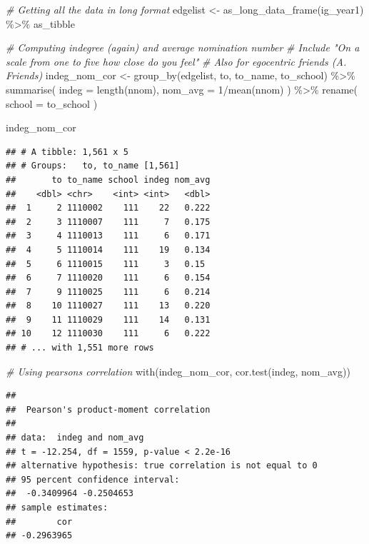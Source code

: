 \documentclass[
]{book}
\newenvironment{Shaded}{\begin{snugshade}}{\end{snugshade}}
\newcommand{\AttributeTok}[1]{\textcolor[rgb]{0.77,0.63,0.00}{#1}}
\newcommand{\CommentTok}[1]{\textcolor[rgb]{0.56,0.35,0.01}{\textit{#1}}}
\newcommand{\DecValTok}[1]{\textcolor[rgb]{0.00,0.00,0.81}{#1}}
\newcommand{\FunctionTok}[1]{\textcolor[rgb]{0.00,0.00,0.00}{#1}}
\newcommand{\NormalTok}[1]{#1}
\newcommand{\OtherTok}[1]{\textcolor[rgb]{0.56,0.35,0.01}{#1}}
\newcommand{\SpecialCharTok}[1]{\textcolor[rgb]{0.00,0.00,0.00}{#1}}
\begin{document}
\begin{Shaded}
\begin{Highlighting}[]
\CommentTok{\# Getting all the data in long format}
\NormalTok{edgelist }\OtherTok{\textless{}{-}} \FunctionTok{as\_long\_data\_frame}\NormalTok{(ig\_year1) }\SpecialCharTok{\%\textgreater{}\%}
\NormalTok{  as\_tibble}

\CommentTok{\# Computing indegree (again) and average nomination number}
\CommentTok{\# Include "On a scale from one to five how close do you feel"}
\CommentTok{\# Also for egocentric friends (A. Friends)}
\NormalTok{indeg\_nom\_cor }\OtherTok{\textless{}{-}} \FunctionTok{group\_by}\NormalTok{(edgelist, to, to\_name, to\_school) }\SpecialCharTok{\%\textgreater{}\%}
  \FunctionTok{summarise}\NormalTok{(}
    \AttributeTok{indeg   =} \FunctionTok{length}\NormalTok{(nnom),}
    \AttributeTok{nom\_avg =} \DecValTok{1}\SpecialCharTok{/}\FunctionTok{mean}\NormalTok{(nnom)}
\NormalTok{  ) }\SpecialCharTok{\%\textgreater{}\%}
  \FunctionTok{rename}\NormalTok{(}
    \AttributeTok{school =}\NormalTok{ to\_school}
\NormalTok{  )}

\NormalTok{indeg\_nom\_cor}
\end{Highlighting}
\end{Shaded}

\begin{verbatim}
## # A tibble: 1,561 x 5
## # Groups:   to, to_name [1,561]
##       to to_name school indeg nom_avg
##    <dbl> <chr>    <int> <int>   <dbl>
##  1     2 1110002    111    22   0.222
##  2     3 1110007    111     7   0.175
##  3     4 1110013    111     6   0.171
##  4     5 1110014    111    19   0.134
##  5     6 1110015    111     3   0.15 
##  6     7 1110020    111     6   0.154
##  7     9 1110025    111     6   0.214
##  8    10 1110027    111    13   0.220
##  9    11 1110029    111    14   0.131
## 10    12 1110030    111     6   0.222
## # ... with 1,551 more rows
\end{verbatim}

\begin{Shaded}
\begin{Highlighting}[]
\CommentTok{\# Using pearson\textquotesingle{}s correlation}
\FunctionTok{with}\NormalTok{(indeg\_nom\_cor, }\FunctionTok{cor.test}\NormalTok{(indeg, nom\_avg))}
\end{Highlighting}
\end{Shaded}

\begin{verbatim}
## 
##  Pearson's product-moment correlation
## 
## data:  indeg and nom_avg
## t = -12.254, df = 1559, p-value < 2.2e-16
## alternative hypothesis: true correlation is not equal to 0
## 95 percent confidence interval:
##  -0.3409964 -0.2504653
## sample estimates:
##        cor 
## -0.2963965
\end{verbatim}
\end{document}
